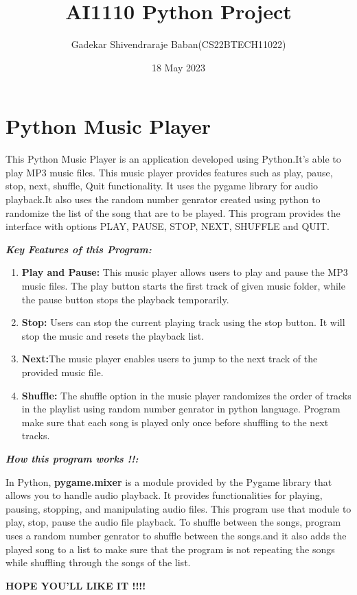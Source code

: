 \documentclass{article}
\title{AI1110 Python Project}
\author{Gadekar Shivendraraje Baban(CS22BTECH11022)}
\date{ 18 May 2023}
\begin{document}
\maketitle

\section*{\textbf{Python Music Player}}


This Python Music Player is an application developed using Python.It's able to play  MP3 music files. This music player provides features such as play, pause, stop, next, shuffle, Quit functionality. It uses the pygame library for audio playback.It also uses the random number genrator created using python to randomize the list of the song that are to be played. This program provides the interface with options PLAY, PAUSE, STOP, NEXT, SHUFFLE and  QUIT.

\begin{flushleft}\textit{\textbf{Key Features of this Program:}}\end{flushleft}
\begin{enumerate}


\item \textbf{Play and Pause:} This music player allows users to play and pause the  MP3 music files. The 
 play button starts the first track of given music folder, while the pause button stops the playback temporarily.

\item \textbf{Stop:} Users can stop the current playing track using the stop button. It will stop the music and resets the playback list.

\item \textbf{Next:}The music player enables users to jump to the next track of the provided music file.

\item \textbf{Shuffle:} The shuffle option in the music player randomizes the order of tracks in the playlist using random number genrator in python language. Program make sure that each song is played only once before shuffling to the next tracks.
\end{enumerate}
\textit{\textbf{How this program works !!:}}



In Python, \textbf{pygame.mixer} is a module provided by the Pygame library that allows you to handle audio playback. It provides functionalities for playing, pausing, stopping, and manipulating audio files.
This program use that module to play, stop, pause the audio file playback.
To shuffle between the songs, program uses a random number genrator to shuffle between the songs.and it also adds the played song to a list to make sure that the program is not repeating the songs while shuffling through the songs of the list.

\begin{center}\textbf{HOPE YOU'LL LIKE IT !!!!}\end{center}
\end{document}
